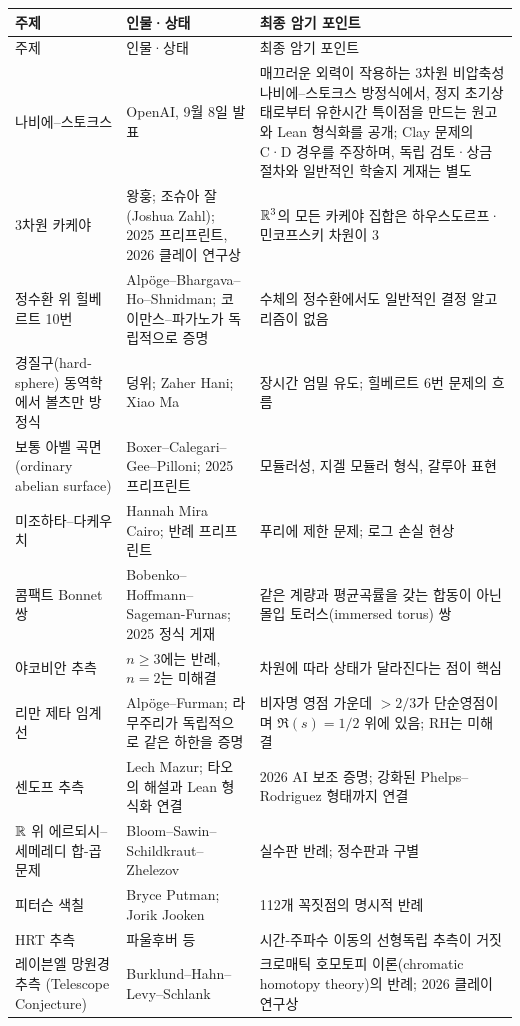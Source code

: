 \begin{center}
\small
\renewcommand{\arraystretch}{1.08}
\begin{longtable}{@{}L{0.27\textwidth}L{0.22\textwidth}L{0.43\textwidth}@{}}
\toprule
주제 & 인물·상태 & 최종 암기 포인트\\
\midrule
\endfirsthead
\toprule 주제 & 인물·상태 & 최종 암기 포인트\\ \midrule \endhead
\bottomrule\endlastfoot
나비에--스토크스 & OpenAI, 9월 8일 발표 & 매끄러운 외력이 작용하는 3차원 비압축성 나비에--스토크스 방정식에서, 정지 초기상태로부터 유한시간 특이점을 만드는 원고와 Lean 형식화를 공개; Clay 문제의 C·D 경우를 주장하며, 독립 검토·상금 절차와 일반적인 학술지 게재는 별도\\
3차원 카케야 & 왕훙; 조슈아 잘 (Joshua Zahl); 2025 프리프린트, 2026 클레이 연구상 & $\mathbb{R}^3$의 모든 카케야 집합은 하우스도르프·민코프스키 차원이 $3$\\
정수환 위 힐베르트 10번 & Alpöge--Bhargava--Ho--Shnidman; 코이만스--파가노가 독립적으로 증명 & 수체의 정수환에서도 일반적인 결정 알고리즘이 없음\\
경질구(hard-sphere) 동역학에서 볼츠만 방정식 & 덩위; Zaher Hani; Xiao Ma & 장시간 엄밀 유도; 힐베르트 6번 문제의 흐름\\
보통 아벨 곡면 (ordinary abelian surface) & Boxer--Calegari--Gee--Pilloni; 2025 프리프린트 & 모듈러성, 지겔 모듈러 형식, 갈루아 표현\\
미조하타--다케우치 & Hannah Mira Cairo; 반례 프리프린트 & 푸리에 제한 문제; 로그 손실 현상\\
콤팩트 Bonnet 쌍 & Bobenko--Hoffmann--Sageman-Furnas; 2025 정식 게재 & 같은 계량과 평균곡률을 갖는 합동이 아닌 몰입 토러스(immersed torus) 쌍\\
야코비안 추측 & $n\ge3$에는 반례, $n=2$는 미해결 & 차원에 따라 상태가 달라진다는 점이 핵심\\
리만 제타 임계선 & Alpöge--Furman; 라무주리가 독립적으로 같은 하한을 증명 & 비자명 영점 가운데 $>2/3$가 단순영점이며 $\Re(s)=1/2$ 위에 있음; RH는 미해결\\
센도프 추측 & Lech Mazur; 타오의 해설과 Lean 형식화 연결 & 2026 AI 보조 증명; 강화된 Phelps--Rodriguez 형태까지 연결\\
$\mathbb{R}$ 위 에르되시--세메레디 합-곱 문제 & Bloom--Sawin--Schildkraut--Zhelezov & 실수판 반례; 정수판과 구별\\
피터슨 색칠 & Bryce Putman; Jorik Jooken & 112개 꼭짓점의 명시적 반례\\
HRT 추측 & 파울후버 등 & 시간-주파수 이동의 선형독립 추측이 거짓\\
레이븐엘 망원경 추측 (Telescope Conjecture) & Burklund--Hahn--Levy--Schlank & 크로매틱 호모토피 이론(chromatic homotopy theory)의 반례; 2026 클레이 연구상\\
\end{longtable}
\end{center}




